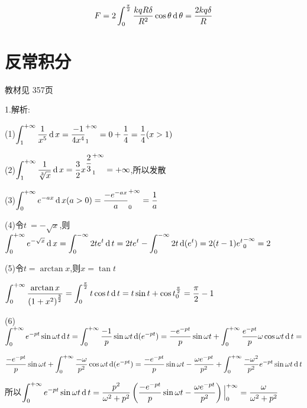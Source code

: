 \[F = 2\displaystyle\int_0^{\frac{\pi }{2}} {\dfrac{{kqR\delta }}{{{R^2}}}} \cos \theta \operatorname{\mathop{}\!\mathrm{d}} \theta  = \dfrac{{2kq\delta }}{R}\]
\section{反常积分}
\begin{flushright}
  \color{zhanqing!80}
   教材见 357页 %
\end{flushright}

1.解析:

(1)$\displaystyle\int_1^{ + \infty } {\dfrac{1}{{{x^5}}}} \operatorname{\mathop{}\!\mathrm{d}} x = \frac{{ - 1}}{{4{x^4}}}_1^{ + \infty } = 0 + \frac{1}{4} = \frac{1}{4}(x > 1)$

(2)$\displaystyle\int_1^{ + \infty } {\dfrac{1}{{\sqrt[3]{x}}}} \operatorname{\mathop{}\!\mathrm{d}} x = \dfrac{3}{2}{x^{\dfrac{2}{3}}}_1^{ + \infty } =  + \infty $,所以发散

(3)$\displaystyle\int_0^{ + \infty } {e^{ - ax}}\operatorname{\mathop{}\!\mathrm{d}} x(a > 0)  = \dfrac{{ - {e^{-ax}}}}{a}_0^{ + \infty } = \dfrac{1}{a}$

(4)令$t\ =  - \sqrt x $,则$\displaystyle\int_0^{ + \infty } {{e^{ - \sqrt x }}\operatorname{\mathop{}\!\mathrm{d}} x}  = \displaystyle\int_0^{ - \infty } {2t{e^t}\operatorname{\mathop{}\!\mathrm{d}} t = 2t{e^t}}  - \displaystyle\int_0^{ - \infty } {2t\operatorname{\mathop{}\!\mathrm{d}} ({e^t})}  = 2(t - 1){e^t}_0^{ - \infty } = 2$

(5)令$t = \arctan x$,则$x = \tan t$

$\displaystyle\int_0^{ + \infty }{\dfrac{{\arctan x}}{{{{\left( {1 + {x^2}} \right)}^{\frac{3}{2}}}}}}= \displaystyle\int_0^{\frac{\pi }{2}} {t\cos t\operatorname{\mathop{}\!\mathrm{d}} t = t\sin t + \cos t} _0^{\frac{\pi }{2}}= \dfrac{\pi }{2} - 1$

(6)$\displaystyle\int_0^{ + \infty } {{e^{ - pt}}\sin \omega t\operatorname{\mathop{}\!\mathrm{d}} t}  = \displaystyle\int_0^{ + \infty } {\dfrac{{ - 1}}{p}\sin \omega t\operatorname{\mathop{}\!\mathrm{d}} ({e^{ - pt}}) = \dfrac{{ - {e^{ - pt}}}}{p}\sin \omega t + \displaystyle\int_0^{ + \infty } {\dfrac{{{e^{ - pt}}}}{p}} } \omega \cos \omega t\operatorname{\mathop{}\!\mathrm{d}} t = $

$\dfrac{{ - {e^{ - pt}}}}{p}\sin \omega t + \displaystyle\int_0^{ + \infty } {\dfrac{{ - \omega }}{{{p^2}}}} \cos \omega t\operatorname{\mathop{}\!\mathrm{d}} ({e^{ - pt}}) = \dfrac{{ - {e^{ - pt}}}}{p}\sin \omega t - \dfrac{{\omega {e^{ - pt}}}}{{{p^2}}} + \displaystyle\int_0^{ + \infty } {\dfrac{{ - {\omega ^2}}}{{{p^2}}}{e^{ - pt}}\sin \omega t\operatorname{\mathop{}\!\mathrm{d}} t} $

所以$\displaystyle\int_0^{ + \infty } {{e}^{ - pt}}\sin \omega t\operatorname{\mathop{}\!\mathrm{d}} t = \dfrac{{{p^2}}}{{{\omega ^2} + {p^2}}} \left(\dfrac{{ - {e^{ - pt}}}}{p}\sin \omega t - \dfrac{{\omega {e^{ - pt}}}}{{{p^2}}}\right)\Big|_0^{ + \infty } = \dfrac{\omega }{{{\omega ^2} + {p^2}}}$

